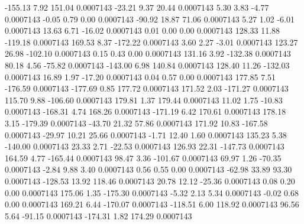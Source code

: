      -155.13        7.92      151.04     0.0007143
      -23.21        9.37       20.44     0.0007143
        5.30        3.83       -4.77     0.0007143
       -0.05        0.79        0.00     0.0007143
      -90.92       18.87       71.06     0.0007143
        5.27        1.02       -6.01     0.0007143
       13.63        6.71      -16.02     0.0007143
        0.01        0.00        0.00     0.0007143
      128.33       11.88     -119.18     0.0007143
      169.53        8.37     -172.22     0.0007143
        3.60        2.27       -3.01     0.0007143
      123.27       26.98     -102.10     0.0007143
        0.15        0.43        0.00     0.0007143
      131.16        3.92     -132.38     0.0007143
       80.18        4.56      -75.82     0.0007143
     -143.00        6.98      140.84     0.0007143
      128.40       11.26     -132.03     0.0007143
       16.89        1.97      -17.20     0.0007143
        0.04        0.57        0.00     0.0007143
      177.85        7.51     -176.59     0.0007143
     -177.69        0.85      177.72     0.0007143
      171.52        2.03     -171.27     0.0007143
      115.70        9.88     -106.60     0.0007143
      179.81        1.37      179.44     0.0007143
       11.02        1.75      -10.83     0.0007143
     -168.31        4.74      168.26     0.0007143
     -171.19        6.42      170.61     0.0007143
      178.18        3.15     -179.39     0.0007143
      -43.70       21.32       57.86     0.0007143
      171.92       10.83     -167.58     0.0007143
      -29.97       10.21       25.66     0.0007143
       -1.71       12.40        1.60     0.0007143
      135.23        5.38     -140.00     0.0007143
       23.33        2.71      -22.53     0.0007143
      126.93       22.31     -147.73     0.0007143
      164.59        4.77     -165.44     0.0007143
       98.47        3.36     -101.67     0.0007143
       69.97        1.26      -70.35     0.0007143
       -2.84        9.88        3.40     0.0007143
        0.56        0.55        0.00     0.0007143
      -62.98       33.89       93.30     0.0007143
     -128.53       13.92      118.46     0.0007143
       20.78       12.12      -25.36     0.0007143
        0.08        0.20        0.00     0.0007143
      175.06        1.35     -175.30     0.0007143
       -5.32        2.13        5.34     0.0007143
       -0.02        0.68        0.00     0.0007143
      169.21        6.44     -170.07     0.0007143
     -118.51        6.00      118.92     0.0007143
       96.56        5.64      -91.15     0.0007143
     -174.31        1.82      174.29     0.0007143
